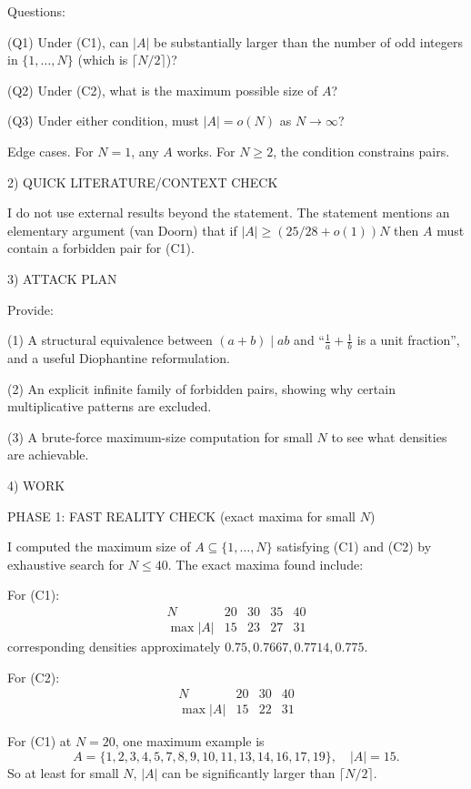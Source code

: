 Questions:

(Q1) Under (C1), can $|A|$ be substantially larger than the number of odd integers in $\{1,\dots,N\}$ (which is $\lceil N/2\rceil$)?

(Q2) Under (C2), what is the maximum possible size of $A$?

(Q3) Under either condition, must $|A|=o(N)$ as $N\to\infty$?

Edge cases.
For $N=1$, any $A$ works. For $N\ge 2$, the condition constrains pairs.


2) QUICK LITERATURE/CONTEXT CHECK

I do not use external results beyond the statement.
The statement mentions an elementary argument (van Doorn) that if $|A|\ge (25/28+o(1))N$ then $A$ must contain a forbidden pair for (C1).


3) ATTACK PLAN

Provide:

(1) A structural equivalence between $(a+b)\mid ab$ and ``$\frac1a+\frac1b$ is a unit fraction'', and a useful Diophantine reformulation.

(2) An explicit infinite family of forbidden pairs, showing why certain multiplicative patterns are excluded.

(3) A brute-force maximum-size computation for small $N$ to see what densities are achievable.


4) WORK

PHASE 1: FAST REALITY CHECK (exact maxima for small $N$)

I computed the maximum size of $A\subseteq\{1,\dots,N\}$ satisfying (C1) and (C2) by exhaustive search for $N\le 40$.
The exact maxima found include:

For (C1):
\[
\begin{array}{c|cccc}
N & 20 & 30 & 35 & 40\\\hline
\max |A| & 15 & 23 & 27 & 31
\end{array}
\]
corresponding densities approximately $0.75, 0.7667, 0.7714, 0.775$.

For (C2):
\[
\begin{array}{c|ccc}
N & 20 & 30 & 40\\\hline
\max |A| & 15 & 22 & 31
\end{array}
\]

For (C1) at $N=20$, one maximum example is
\[
A=\{1,2,3,4,5,7,8,9,10,11,13,14,16,17,19\},\quad |A|=15.
\]
So at least for small $N$, $|A|$ can be significantly larger than $\lceil N/2\rceil$.


